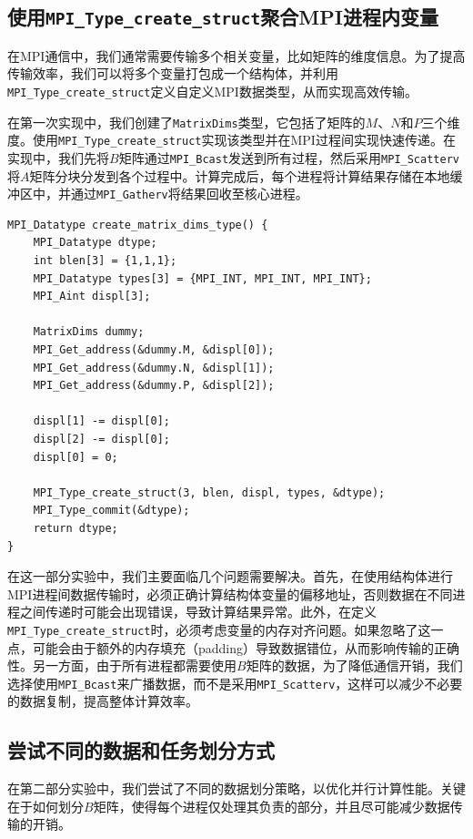 \documentclass[a4paper, utf8]{ctexart}
\begin{document}
	\subsection{使用\texttt{MPI\_Type\_create\_struct}聚合MPI进程内变量}
	
	在MPI通信中，我们通常需要传输多个相关变量，比如矩阵的维度信息。为了提高传输效率，我们可以将多个变量打包成一个结构体，并利用\verb|MPI_Type_create_struct|定义自定义MPI数据类型，从而实现高效传输。
	
	在第一次实现中，我们创建了\verb|MatrixDims|类型，它包括了矩阵的$M$、$N$和$P$三个维度。使用\verb|MPI_Type_create_struct|实现该类型并在MPI过程间实现快速传递。在实现中，我们先将$B$矩阵通过\verb|MPI_Bcast|发送到所有过程，然后采用\verb|MPI_Scatterv|将$A$矩阵分块分发到各个过程中。计算完成后，每个进程将计算结果存储在本地缓冲区中，并通过\verb|MPI_Gatherv|将结果回收至核心进程。
	
	\begin{verbatim}
MPI_Datatype create_matrix_dims_type() {
    MPI_Datatype dtype;
    int blen[3] = {1,1,1};
    MPI_Datatype types[3] = {MPI_INT, MPI_INT, MPI_INT};
    MPI_Aint displ[3];
    
    MatrixDims dummy;
    MPI_Get_address(&dummy.M, &displ[0]);
    MPI_Get_address(&dummy.N, &displ[1]);
    MPI_Get_address(&dummy.P, &displ[2]);
    
    displ[1] -= displ[0];
    displ[2] -= displ[0];
    displ[0] = 0;

    MPI_Type_create_struct(3, blen, displ, types, &dtype);
    MPI_Type_commit(&dtype);
    return dtype;
}
	\end{verbatim}

	在这一部分实验中，我们主要面临几个问题需要解决。首先，在使用结构体进行MPI进程间数据传输时，必须正确计算结构体变量的偏移地址，否则数据在不同进程之间传递时可能会出现错误，导致计算结果异常。此外，在定义\verb|MPI_Type_create_struct|时，必须考虑变量的内存对齐问题。如果忽略了这一点，可能会由于额外的内存填充（padding）导致数据错位，从而影响传输的正确性。另一方面，由于所有进程都需要使用$B$矩阵的数据，为了降低通信开销，我们选择使用\verb|MPI_Bcast|来广播数据，而不是采用\verb|MPI_Scatterv|，这样可以减少不必要的数据复制，提高整体计算效率。

	\subsection{尝试不同的数据和任务划分方式}
	
	在第二部分实验中，我们尝试了不同的数据划分策略，以优化并行计算性能。关键在于如何划分$B$矩阵，使得每个进程仅处理其负责的部分，并且尽可能减少数据传输的开销。
	
\end{document}
